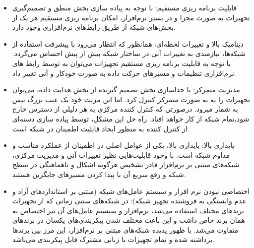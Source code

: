 \begin{itemize}
	\item
قابلیت برنامه ریزی مستفیم: با توجه به پیاده سازی بخش منطق و تصمیم‌گیری تجهیزات به صورت مجزا و در بستر نرم‌افزار، امکان برنامه ریزی مستقیم هر یک از بخش‌های شبکه از طریق رابط‌های نرم‌افزاری وجود دارد.
	\item 
دینامیک بالا و تغییرات لحظه‌ای: همانظور که انتظار می‌رود با پیشرفت استفاده از شبکه‌ها، نیازمندی به تغییرات آنی در ساختار شبکه بیش از پیش احساس می‌گردد. با توجه به قابلیت برنامه ریزی مستقیم تجهیزات می‌توان به توسط رابط های نرم‌افزاری تنظیمات و مسیر‌های حرکت داده به صورت خودکار و آنی تغییر داد.
	\item 
مدیریت متمرکز: با جداسازی بخش تصمیم گیرنده از بخش هدایت داده، می‌توان تجهیزات را به به صورت متمرکز کنترل کرد. اما این مزیت خود یک عیب بزرگ نیس به شمار میرود. درصورتی که کنترل کننده مرکزی به هر دلیلی از دسترس خارج شود،‌تمام شبکه از کار خواهد افتاد. راه حل این مشکل، توسط پیاده سازی دسته‌ای از کنترل کننده به منظور ایجاد قابلیت اطمینان در شبکه است.
	\item
پایداری بالا: پایداری بالا، یکی از عوامل اصلی در اطمینان از عملکرد مناسب و مداوم شبکه است. با وجود قابلیت‌هایی نظیر تغییرات آنی و مدیریت مرکزی، شبکه‌های مبتنی بر نرم‌افزار قادر تشخیص هرگونه اشکال و ناهماهنگی در سطح شبکه و رفع سریع آن با پیدا کردن مسیر‌های جایگزین هستند.
	\item 
اختصاصی نبودن نرم افزار و سیستم عامل‌های شبکه (مبتنی بر استاندارد‌های آزاد و عدم وابستگی به فروشنده تجهیز شبکه): در شبکه‌های سنتی زمانی که از تجهیزات برند‌های مختلف استفاده می‌شد، نرم‌افزار و سیستم عامل‌های آن نیز اختصاص به همان برند خاص داشت و این باعث مختلف شدن پیکربندی‌های یکسان در برند‌های متفاوت می‌شد. با ظهور پدیده شبکه‌های مبتنی بر نرم‌افزار، این مرز بین برند‌ها برداشته شده و تمام تجهیزات با زبانی مشترک قابل پیکربندی می‌باشد.
\end{itemize}

